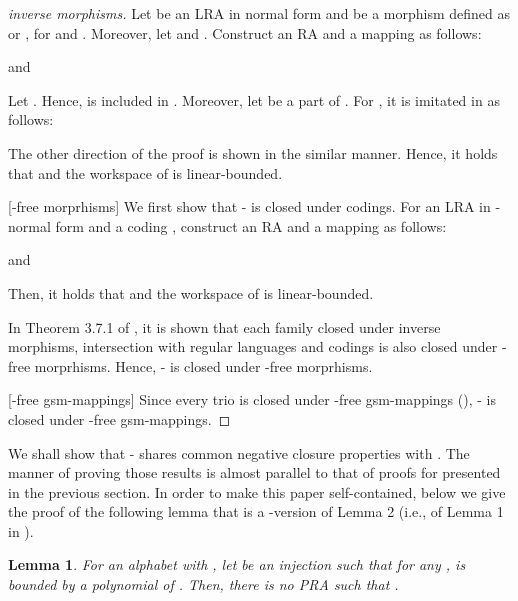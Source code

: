 \documentclass[preprint,fleqn,1p]{elsarticle}
\newtheorem{lem}{Lemma}
\begin{document}
\begin{proof}
[inverse morphisms] Let  be an LRA in normal form and  be a morphism defined as  or , for  and . Moreover, let  and .  Construct an RA  and a mapping  as follows:

and

Let . Hence,  is included in .
Moreover, let  be a part of . For , it is imitated in  as follows:


The other direction of the proof is shown in the similar manner. Hence, it holds that  and the workspace of  is linear-bounded.

[-free morprhisms]
We first show that - is closed under codings.
For an LRA  in -normal form and a coding , construct an RA  and a mapping   as follows:

and

Then, it holds that  and the workspace of  is linear-bounded.

In Theorem 3.7.1 of \cite{SG:75}, it is shown that each family closed under inverse morphisms, intersection with regular languages and codings is also closed under -free morprhisms. Hence, - is closed under -free morprhisms.

[-free gsm-mappings]
Since every trio is closed under -free gsm-mappings (\cite{AS:73}), - is closed under -free gsm-mappings.
\end{proof}

We shall show that - shares common negative closure properties with . The manner of proving those results is almost parallel to that of proofs for  presented in the previous section. In order to make this paper self-contained,  below we give the proof of the following lemma that is a -version of 
Lemma 2 (i.e., of Lemma 1 in \cite{OKY:12}). 
 
\begin{lem}
For an alphabet  with , let  be an injection such that for any ,  is bounded by a polynomial of . Then, there is no PRA  such that . 
\label{lem-ww-lambda}
\end{lem}
\end{document}
